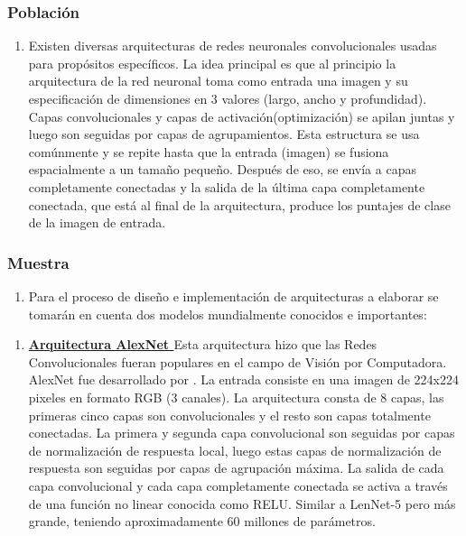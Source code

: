 		\subsubsection{Población}
		\begin{enumerate}		
			\item[] Existen diversas arquitecturas de redes neuronales convolucionales usadas para propósitos específicos. La idea principal es que al principio la arquitectura de la red neuronal toma como entrada una imagen y su especificación de dimensiones en 3 valores (largo, ancho y profundidad). Capas convolucionales y capas de activación(optimización) se apilan juntas y luego son seguidas por capas de agrupamientos. Esta estructura se usa comúnmente y se repite hasta que la entrada (imagen) se fusiona espacialmente a un tamaño pequeño. Después de eso, se envía a capas completamente conectadas y la salida de la última capa completamente conectada, que está al final de la arquitectura, produce los puntajes de clase de la imagen de entrada.
		\end{enumerate}
		
	
		\subsubsection{Muestra}
		\begin{enumerate}		
		\item[] Para el proceso de diseño e implementación de arquitecturas a elaborar se tomarán en cuenta dos modelos mundialmente conocidos e importantes:
		\end{enumerate}
				
		\begin{enumerate}
		\item[] {\bf \underline {Arquitectura AlexNet }}\newline
			Esta arquitectura hizo que las Redes Convolucionales fueran populares en el campo de Visión por Computadora. AlexNet fue desarrollado por \citep{Krizhevsky2012}. La entrada consiste en una imagen de 224x224 pixeles en formato RGB (3 canales). La arquitectura consta de 8 capas, las primeras cinco capas son convolucionales y el resto son capas totalmente conectadas. La primera y segunda capa convolucional son seguidas por capas de normalización de respuesta local, luego estas capas de normalización de respuesta son seguidas por capas de agrupación máxima. La salida de cada capa convolucional y cada capa completamente conectada se activa a través de  una función no linear conocida como RELU. Similar a LenNet-5\citep{LeCun} pero más grande, teniendo aproximadamente 60 millones de parámetros.
		\end{enumerate}

